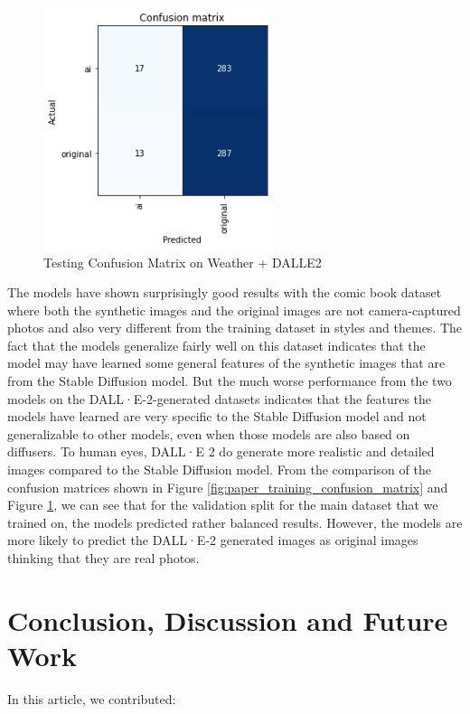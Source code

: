 \documentclass[11pt]{article}
\begin{document}
\begin{figure}[ht]
  \includegraphics[width=190pt]{./assets/paper_dalle2_weather_confusion_matrix.png}
  \caption{Testing Confusion Matrix on Weather + DALLE2}
  \label{fig:paper_dalle2_weather_confusion_matrix}
\end{figure}

The models have shown surprisingly good results with the comic book dataset where both the synthetic images and the original images are not camera-captured photos and also very different from the training dataset in styles and themes. The fact that the models generalize fairly well on this dataset indicates that the model may have learned some general features of the synthetic images that are from the Stable Diffusion model. But the much worse performance from the two models on the DALL·E-2-generated datasets indicates that the features the models have learned are very specific to the Stable Diffusion model and not generalizable to other models, even when those models are also based on diffusers. To human eyes, DALL·E 2 do generate more realistic and detailed images compared to the Stable Diffusion model. From the comparison of the confusion matrices shown in Figure \ref{fig:paper_training_confusion_matrix} and Figure \ref{fig:paper_dalle2_weather_confusion_matrix}, we can see that for the validation split for the main dataset that we trained on, the models predicted rather balanced results. However, the models are more likely to predict the DALL·E-2 generated images as original images thinking that they are real photos.

\section{Conclusion, Discussion and Future Work}

In this article, we contributed:
\end{document}
